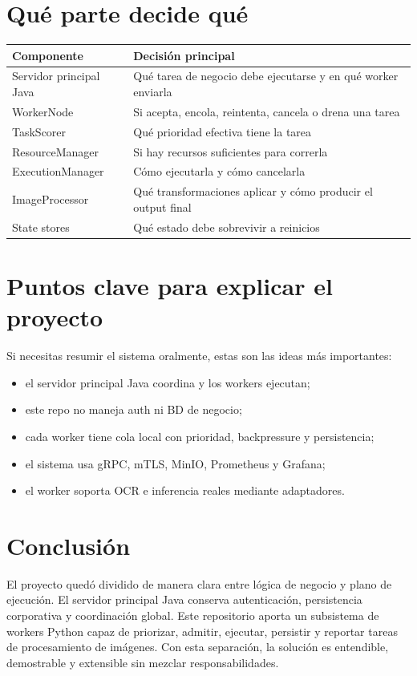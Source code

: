 \documentclass[11pt]{article}
\begin{document}
\section{Qué parte decide qué}
\begin{longtable}{>{\raggedright\arraybackslash}p{3.8cm} >{\raggedright\arraybackslash}p{9.6cm}}
\toprule
\textbf{Componente} & \textbf{Decisión principal} \\
\midrule
Servidor principal Java & Qué tarea de negocio debe ejecutarse y en qué worker enviarla \\
WorkerNode & Si acepta, encola, reintenta, cancela o drena una tarea \\
TaskScorer & Qué prioridad efectiva tiene la tarea \\
ResourceManager & Si hay recursos suficientes para correrla \\
ExecutionManager & Cómo ejecutarla y cómo cancelarla \\
ImageProcessor & Qué transformaciones aplicar y cómo producir el output final \\
State stores & Qué estado debe sobrevivir a reinicios \\
\bottomrule
\end{longtable}

\section{Puntos clave para explicar el proyecto}
Si necesitas resumir el sistema oralmente, estas son las ideas más importantes:
\begin{itemize}
\item el servidor principal Java coordina y los workers ejecutan;
\item este repo no maneja auth ni BD de negocio;
\item cada worker tiene cola local con prioridad, backpressure y persistencia;
\item el sistema usa gRPC, mTLS, MinIO, Prometheus y Grafana;
\item el worker soporta OCR e inferencia reales mediante adaptadores.
\end{itemize}

\section{Conclusión}
El proyecto quedó dividido de manera clara entre lógica de negocio y plano de ejecución. El servidor principal Java conserva autenticación, persistencia corporativa y coordinación global. Este repositorio aporta un subsistema de workers Python capaz de priorizar, admitir, ejecutar, persistir y reportar tareas de procesamiento de imágenes. Con esta separación, la solución es entendible, demostrable y extensible sin mezclar responsabilidades.
\end{document}
